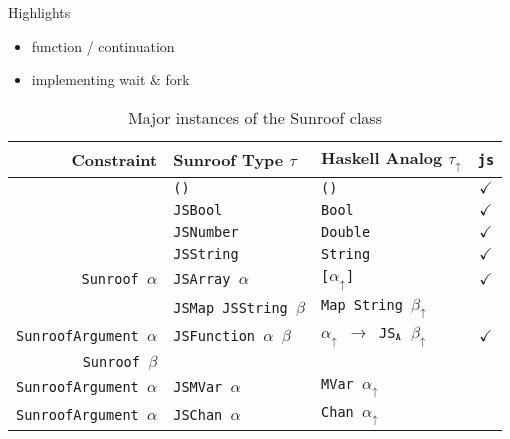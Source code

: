 \documentclass{llncs}
\newcommand{\HaskellAnalog}[1]{#1\ensuremath{_\uparrow}}
\newcommand{\Src}[1]{{\tt{#1}}}
\begin{document}
Highlights
\begin{itemize}
\item function / continuation
\item implementing wait \& fork
\end{itemize}

\begin{table}
\caption{Major instances of the Sunroof class}
\begin{center}
\begin{tabular}{r@{\quad}l@{\quad}l@{\quad}c}
\hline\rule{0pt}{12pt}%
  Constraint
  & Sunroof Type $\tau$
  & Haskell Analog \HaskellAnalog{$\tau$}
  & \Src{js} \\ \hline\rule{0pt}{12pt}%
  
  & \Src{()}       & \Src{()}     & $\checkmark$ \\
  & \Src{JSBool}   & \Src{Bool}   & $\checkmark$ \\
  & \Src{JSNumber} & \Src{Double} & $\checkmark$ \\
  & \Src{JSString} & \Src{String} & $\checkmark$ \\
  
  \Src{Sunroof $\alpha$}
  & \Src{JSArray $\alpha$} 
  & \Src{[$\HaskellAnalog{\alpha}$]}
  & $\checkmark$ \\
  
  & \Src{JSMap JSString $\beta$}
  & \Src{Map String $\HaskellAnalog{\beta}$}
  & \\
  
  \Src{SunroofArgument $\alpha$}
  & \Src{JSFunction $\alpha$ $\beta$ }
  & \Src{$\HaskellAnalog{\alpha}$ $\rightarrow$ JS$_\Src{A}$ $\HaskellAnalog{\beta}$} 
  & $\checkmark$ \\
  \Src{Sunroof $\beta$} \\
  
  \Src{SunroofArgument $\alpha$}
  & \Src{JSMVar $\alpha$}
  & \Src{MVar $\HaskellAnalog{\alpha}$}
  & \\
  
  \Src{SunroofArgument $\alpha$}
  & \Src{JSChan $\alpha$}
  & \Src{Chan $\HaskellAnalog{\alpha}$}
  & \\[2pt]
\hline
\end{tabular}
\end{center}
\end{table} 
\end{document}
